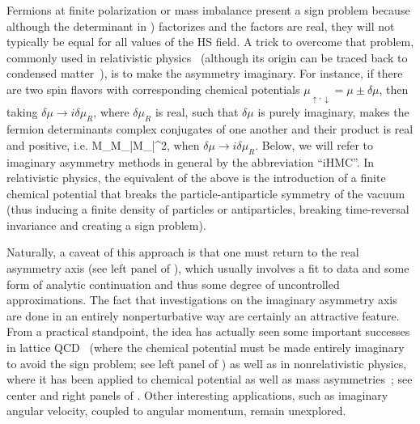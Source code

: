 \documentclass[../main.tex]{subfiles}
\begin{document}
Fermions at finite polarization or mass imbalance present a sign problem because although the determinant in
) factorizes
and the factors are real, they will not typically be equal for all values of the HS field. A trick to overcome that problem,
commonly used in relativistic physics~\cite{DEFORCRAND2002290, DEFORCRAND2003170, PhysRevD.67.014505, PhysRevD.70.074509} (although its origin can be traced back to condensed matter~\cite{PhysRevB.41.811}), is to make the asymmetry imaginary.
For instance, if there are two spin flavors with
corresponding chemical potentials $\mu_{\uparrow,\downarrow} = \mu \pm \delta \mu$, then taking $\delta \mu \to i \delta \mu_R$,
where $\delta \mu_R$ is real, such that $\delta \mu$ is purely imaginary, makes the fermion determinants complex
conjugates of one another and their product is real and positive, i.e.
%
\beq
\det M_\uparrow \det M_\downarrow \to |\det M_\uparrow |^2,
\eeq
%
when ${\delta \mu \to i \delta \mu_R}$. Below, we will refer to imaginary asymmetry methods in general by the abbreviation ``iHMC''.
In relativistic physics, the equivalent of the above is the introduction of a finite chemical potential that breaks the particle-antiparticle symmetry of
the vacuum (thus inducing a finite density of particles or antiparticles, breaking time-reversal invariance and creating a sign problem).
%

%

Naturally, a caveat of this approach is that one must return to the real asymmetry axis (see left panel of ), which usually involves a fit to data and some form of analytic
continuation and thus some degree of uncontrolled approximations. The fact that investigations on the imaginary asymmetry axis are done in an
entirely nonperturbative way are certainly an attractive feature. From a practical standpoint, the idea has actually seen some important successes in
lattice QCD~\cite{PhysRevLett.105.152001, PhysRevD.85.094512, Gunther:2016vcp} (where the chemical potential must be made entirely imaginary to avoid the sign
problem; see left panel of ) as well as in nonrelativistic physics, where it has been applied to chemical potential as well as mass
asymmetries~\cite{Roscher:2013aqa, PhysRevLett.110.130404, PhysRevA.92.063609, PhysRevLett.114.050404, PRD96094506};
see center and right panels of .
Other interesting applications, such as imaginary angular velocity, coupled to angular momentum, remain unexplored.
%
\end{document}
